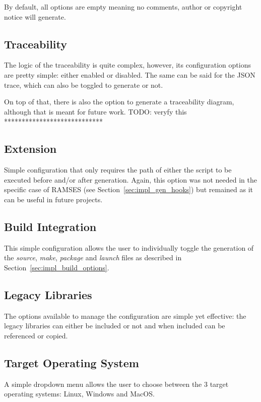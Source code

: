 By default, all options are empty meaning no comments, author or copyright notice will generate.



\subsection{Traceability}
\label{sec:dsl_trace}

The logic of the traceability is quite complex, however, its configuration options are pretty simple: either enabled or disabled. The same can be said for the \gls{JSON} trace, which can also be toggled to generate or not.

On top of that, there is also the option to generate a traceability diagram, although that is meant for future work. TODO: veryfy this ****************************



\subsection{Extension}
\label{sec:dsl_ext}

Simple configuration that only requires the path of either the script to be executed before and/or after generation. Again, this option was not needed in the specific case of \gls{RAMSES} (see Section~\ref{sec:impl_gen_hooks}) but remained as it can be useful in future projects.



\subsection{Build Integration}
\label{sec:dsl_build}

This simple configuration allows the user to individually toggle the generation of the \textit{source}, \textit{make}, \textit{package} and \textit{launch} files as described in Section~\ref{sec:impl_build_options}.



\subsection{Legacy Libraries}
\label{sec:dsl_legacy}

The options available to manage the configuration are simple yet effective: the legacy libraries can either be included or not and when included can be referenced or copied.



\subsection{Target Operating System}
\label{sec:dsl_os}

A simple dropdown menu allows the user to choose between the 3 target operating systems: Linux, Windows and MacOS.





















